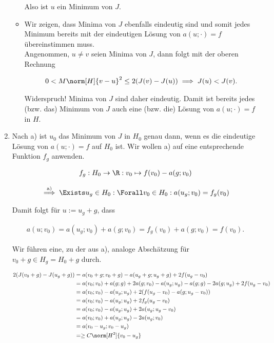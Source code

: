 \begin{solution}
\begin{enumerate}[label = \textbf{\alph*)}]
\begin{itemize}
    Also ist $u$ ein Minimum von $J$.

    \item
    [\Quote{$\impliedby$:}]
    Wir zeigen, dass Minima von $J$ ebenfalls eindeutig sind und somit jedes Minimum bereits mit der eindeutigen Lösung von $a(u;\cdot) = f$ übereinstimmen muss. \\

    Angenommen, $u \neq v$ seien Minima von $J$, dann folgt mit der oberen Rechnung

    \begin{align*}
      0 < M \norm[H]{v - u}^2 \leq 2(J(v) - J(u))
      \implies
      J(u) < J(v).
    \end{align*}

    Widerspruch!
    Minima von $J$ sind daher eindeutig.
    Damit ist bereits jedes (bzw. das) Minimum von $J$ auch eine (bzw. die) Lösung von $a(u; \cdot) = f$ in $H$.

  \end{itemize}

  \item Nach a) ist $u_0$ das Minimum von $J$ in $H_0$ genau dann, wenn es die eindeutige Lösung von $a(u; \cdot) = f$ auf $H_0$ ist.
  Wir wollen a) auf eine entsprechende Funktion $f_g$ anwenden.

  \begin{align*}
    f_g:
    H_0 \to \R:
    v_0 \mapsto f(v_0)  - a(g; v_0)
  \end{align*}

  \begin{align*}
    \stackrel{\text{a)}}{\implies}
    \Exists u_g \in H_0:
    \Forall v_0 \in H_0:
    a(u_g; v_0) = f_g(v_0)
  \end{align*}
  
  Damit folgt für $u := u_g + g$, dass
  
  \begin{align*}
    a(u; v_0)
    =
    a(u_g; v_0) + a(g; v_0) = f_g(v_0) + a(g; v_0)
    =
    f(v_0).
  \end{align*}
  
  Wir führen eine, zu der aus a),  analoge Abschätzung für $v_0 + g \in H_g = H_0 + g$ durch.
  
  \begin{align*}
    2(J(v_0 + g) - J(u_g + g))
    & =
    a(v_0 + g; v_0 + g) - a(u_g + g; u_g + g) + 2f(u_g - v_0) \\
    & =
    a(v_0; v_0) + a(g; g) + 2a(g; v_0) - a(u_g; u_g) - a(g; g) - 2a (g; u_g) + 2 f(u_g - v_0) \\
    & =
    a(v_0; v_0)  - a(u_g; u_g) + 2(f(u_g - v_0) - a(g; u_g - v_0)) \\
    & =
    a(v_0; v_0)  - a(u_g; u_g) + 2f_g(u_g - v_0) \\
    & =
    a(v_0; v_0)  - a(u_g; u_g) + 2a(u_g; u_g - v_0) \\
    & =
    a(v_0; v_0)  + a(u_g; u_g) - 2a(u_g; v_0) \\
    & =
    a(v_0 - u_g; v_0 - u_g) \\
    & =
    \geq C \norm[H^2]{v_0 - u_g}
  \end{align*}
  

\end{enumerate}
\end{solution}
